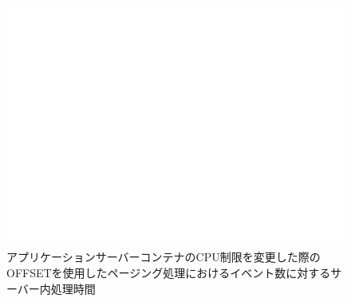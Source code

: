 \documentclass[../../../../../main]{subfiles}
\begin{document}
    \begin{figure}[H]
        \centering
        \includegraphics[width=12cm]{graph}
        \caption{アプリケーションサーバーコンテナのCPU制限を変更した際のOFFSETを使用したページング処理におけるイベント数に対するサーバー内処理時間}
        \label{fig:paging-offset-change-app-cpu-limit-server-time-app_1024-db_1_1024}
    \end{figure}
\end{document}
